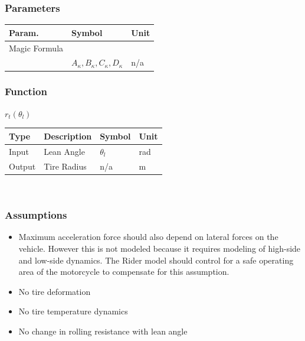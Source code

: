 \documentclass[../SimBALink.tex]{subfiles}
\begin{document}
\subsubsection{Parameters}
	\begin{tabular}{ l | l | l  }
		Param.					&	Symbol		&	Unit		\\	\hline
		 Magic Formula\\		&	$A_{\kappa},B_{\kappa},C_{\kappa},D_{\kappa}$		&	 n/a \\
	\end{tabular}
	
\subsubsection{Function}
$r_t(\theta_l)$ \\
	\begin{tabular}{ l | l | l | l }
		Type				& Description		&	Symbol		&	Unit		\\	\hline
		Input 				& Lean Angle		&	$\theta_l$  & 	rad		\\
		Output 				& Tire Radius		&	n/a			&	m
	\end{tabular} \\

\subsubsection{Assumptions}
\begin{itemize}
  \item Maximum acceleration force should also depend on lateral forces on the vehicle. However this is not modeled because it requires modeling of high-side and low-side dynamics. The Rider model should control for a safe operating area of the motorcycle to compensate for this assumption. 
  \item No tire deformation
  \item No tire temperature dynamics
  \item No change in rolling resistance with lean angle 
\end{itemize}
\end{document}
